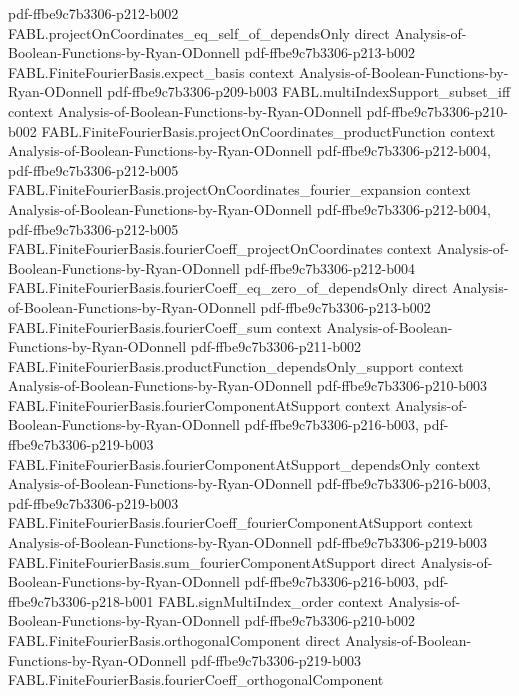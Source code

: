 \begin{theorem}
  {pdf-ffbe9c7b3306-p212-b002}
\proofstep
  {FABL.projectOnCoordinates_eq_self_of_dependsOnly}
  {direct}
  {Analysis-of-Boolean-Functions-by-Ryan-ODonnell}
  {pdf-ffbe9c7b3306-p213-b002}
\proofstep
  {FABL.FiniteFourierBasis.expect_basis}
  {context}
  {Analysis-of-Boolean-Functions-by-Ryan-ODonnell}
  {pdf-ffbe9c7b3306-p209-b003}
\proofstep
  {FABL.multiIndexSupport_subset_iff}
  {context}
  {Analysis-of-Boolean-Functions-by-Ryan-ODonnell}
  {pdf-ffbe9c7b3306-p210-b002}
\proofstep
  {FABL.FiniteFourierBasis.projectOnCoordinates_productFunction}
  {context}
  {Analysis-of-Boolean-Functions-by-Ryan-ODonnell}
  {pdf-ffbe9c7b3306-p212-b004,
    pdf-ffbe9c7b3306-p212-b005}
\proofstep
  {FABL.FiniteFourierBasis.projectOnCoordinates_fourier_expansion}
  {context}
  {Analysis-of-Boolean-Functions-by-Ryan-ODonnell}
  {pdf-ffbe9c7b3306-p212-b004,
    pdf-ffbe9c7b3306-p212-b005}
\proofstep
  {FABL.FiniteFourierBasis.fourierCoeff_projectOnCoordinates}
  {context}
  {Analysis-of-Boolean-Functions-by-Ryan-ODonnell}
  {pdf-ffbe9c7b3306-p212-b004}
\proofstep
  {FABL.FiniteFourierBasis.fourierCoeff_eq_zero_of_dependsOnly}
  {direct}
  {Analysis-of-Boolean-Functions-by-Ryan-ODonnell}
  {pdf-ffbe9c7b3306-p213-b002}
\proofstep
  {FABL.FiniteFourierBasis.fourierCoeff_sum}
  {context}
  {Analysis-of-Boolean-Functions-by-Ryan-ODonnell}
  {pdf-ffbe9c7b3306-p211-b002}
\proofstep
  {FABL.FiniteFourierBasis.productFunction_dependsOnly_support}
  {context}
  {Analysis-of-Boolean-Functions-by-Ryan-ODonnell}
  {pdf-ffbe9c7b3306-p210-b003}
\proofstep
  {FABL.FiniteFourierBasis.fourierComponentAtSupport}
  {context}
  {Analysis-of-Boolean-Functions-by-Ryan-ODonnell}
  {pdf-ffbe9c7b3306-p216-b003,
    pdf-ffbe9c7b3306-p219-b003}
\proofstep
  {FABL.FiniteFourierBasis.fourierComponentAtSupport_dependsOnly}
  {context}
  {Analysis-of-Boolean-Functions-by-Ryan-ODonnell}
  {pdf-ffbe9c7b3306-p216-b003,
    pdf-ffbe9c7b3306-p219-b003}
\proofstep
  {FABL.FiniteFourierBasis.fourierCoeff_fourierComponentAtSupport}
  {context}
  {Analysis-of-Boolean-Functions-by-Ryan-ODonnell}
  {pdf-ffbe9c7b3306-p219-b003}
\proofstep
  {FABL.FiniteFourierBasis.sum_fourierComponentAtSupport}
  {direct}
  {Analysis-of-Boolean-Functions-by-Ryan-ODonnell}
  {pdf-ffbe9c7b3306-p216-b003,
    pdf-ffbe9c7b3306-p218-b001}
\proofstep
  {FABL.signMultiIndex_order}
  {context}
  {Analysis-of-Boolean-Functions-by-Ryan-ODonnell}
  {pdf-ffbe9c7b3306-p210-b002}
\proofstep
  {FABL.FiniteFourierBasis.orthogonalComponent}
  {direct}
  {Analysis-of-Boolean-Functions-by-Ryan-ODonnell}
  {pdf-ffbe9c7b3306-p219-b003}
\proofstep
  {FABL.FiniteFourierBasis.fourierCoeff_orthogonalComponent}

\end{theorem}
